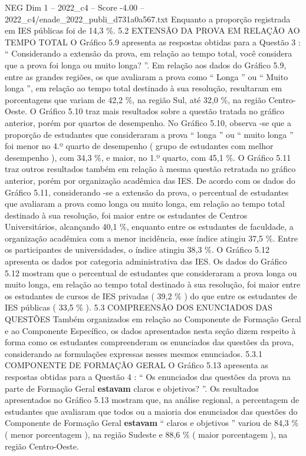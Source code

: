 \begin{textsample}{NEG Dim 1 – 2022\_c4 – Score -4.00 – 2022\_c4/enade\_2022\_publi\_d731a0a567.txt}
Enquanto a proporção registrada em IES públicas foi de 14,3 \%. 5.2 EXTENSÃO DA PROVA EM RELAÇÃO AO TEMPO TOTAL O Gráfico 5.9 apresenta as respostas obtidas para a Questão 3 : “ Considerando a extensão da prova, em relação ao tempo total, você considera que a prova foi longa ou muito longa? ”.
Em relação aos dados do Gráfico 5.9, entre as grandes regiões, os que avaliaram a prova como “ Longa ” ou “ Muito longa ”, em relação ao tempo total destinado à sua resolução, resultaram em porcentagens que variam de 42,2 \%, na região Sul, até 32,0 \%, na região Centro-Oeste.
O Gráfico 5.10 traz mais resultados sobre a questão tratada no gráfico anterior, porém por quartos de desempenho.
No Gráfico 5.10, observa -se que a proporção de estudantes que consideraram a prova “ longa ” ou “ muito longa ” foi menor no 4.º quarto de desempenho ( grupo de estudantes com melhor desempenho ), com 34,3 \%, e maior, no 1.º quarto, com 45,1 \%.
O Gráfico 5.11 traz outros resultados também em relação à mesma questão retratada no gráfico anterior, porém por organização acadêmica das IES.
De acordo com os dados do Gráfico 5.11, considerando -se a extensão da prova, o percentual de estudantes que avaliaram a prova como longa ou muito longa, em relação ao tempo total destinado à sua resolução, foi maior entre os estudantes de Centros Universitários, alcançando 40,1 \%, enquanto entre os estudantes de faculdade, a organização acadêmica com a menor incidência, esse índice atingiu 37,5 \%.
Entre os participantes de universidades, o índice atingiu 38,3 \%.
O Gráfico 5.12 apresenta os dados por categoria administrativa das IES.
Os dados do Gráfico 5.12 mostram que o percentual de estudantes que consideraram a prova longa ou muito longa, em relação ao tempo total destinado à sua resolução, foi maior entre os estudantes de cursos de IES privadas ( 39,2 \% ) do que entre os estudantes de IES públicas ( 33,5 \% ). 5.3 COMPREENSÃO DOS ENUNCIADOS DAS QUESTÕES Também organizados em relação ao Componente de Formação Geral e ao Componente Específico, os dados apresentados nesta seção dizem respeito à forma como os estudantes compreenderam os enunciados das questões da prova, considerando as formulações expressas nesses mesmos enunciados. 5.3.1 COMPONENTE DE FORMAÇÃO GERAL O Gráfico 5.13 apresenta as respostas obtidas para a Questão 4 : “ Os enunciados das questões da prova na parte de Formação Geral \textbf{estavam} claros e objetivos? ”.
Os resultados apresentados no Gráfico 5.13 mostram que, na análise regional, a percentagem de estudantes que avaliaram que todos ou a maioria dos enunciados das questões do Componente de Formação Geral \textbf{estavam} “ claros e objetivos ” variou de 84,3 \% ( menor porcentagem ), na região Sudeste e 88,6 \% ( maior porcentagem ), na região Centro-Oeste.

\end{textsample}
